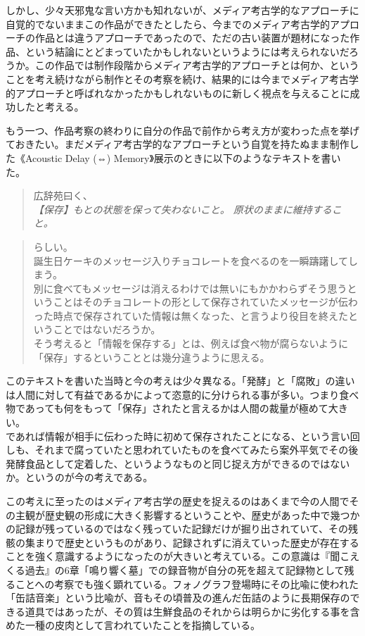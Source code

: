 \documentclass[a4paper,report]{jsbook}
\begin{document}
しかし、少々天邪鬼な言い方かも知れないが、メディア考古学的なアプローチに自覚的でないままこの作品ができたとしたら、今までのメディア考古学的アプローチの作品とは違うアプローチであったので、ただの古い装置が題材になった作品、という結論にとどまっていたかもしれないというようには考えられないだろうか。この作品では制作段階からメディア考古学的アプローチとは何か、ということを考え続けながら制作とその考察を続け、結果的には今までメディア考古学的アプローチと呼ばれなかったかもしれないものに新しく視点を与えることに成功したと考える。

もう一つ、作品考察の終わりに自分の作品で前作から考え方が変わった点を挙げておきたい。まだメディア考古学的なアプローチという自覚を持たぬまま制作した《Acoustic
Delay (⇔) Memory》展示のときに以下のようなテキストを書いた。

\begin{quote}
広辞苑曰く、\\
\emph{【保存】もとの状態を保って失わないこと。
原状のままに維持すること。}
\end{quote}

\begin{quote}
らしい。\\
誕生日ケーキのメッセージ入りチョコレートを食べるのを一瞬躊躇してしまう。\\
別に食べてもメッセージは消えるわけでは無いにもかかわらずそう思うということはそのチョコレートの形として保存されていたメッセージが伝わった時点で保存されていた情報は無くなった、と言うより役目を終えたということではないだろうか。\\
そう考えると「情報を保存する」とは、例えば食べ物が腐らないように「保存」するということとは幾分違うように思える。
\end{quote}

このテキストを書いた当時と今の考えは少々異なる。「発酵」と「腐敗」の違いは人間に対して有益であるかによって恣意的に分けられる事が多い。つまり食べ物であっても何をもって「保存」されたと言えるかは人間の裁量が極めて大きい。\\
であれば情報が相手に伝わった時に初めて保存されたことになる、という言い回しも、それまで腐っていたと思われていたものを食べてみたら案外平気でその後発酵食品として定着した、というようなものと同じ捉え方ができるのではないか。というのが今の考えである。

この考えに至ったのはメディア考古学の歴史を捉えるのはあくまで今の人間でその主観が歴史観の形成に大きく影響するということや、歴史があった中で幾つかの記録が残っているのではなく残っていた記録だけが掘り出されていて、その残骸の集まりで歴史というものがあり、記録されずに消えていった歴史が存在することを強く意識するようになったのが大きいと考えている。この意識は『聞こえくる過去』の6章「鳴り響く墓」での録音物が自分の死を超えて記録物として残ることへの考察でも強く顕れている。フォノグラフ登場時にその比喩に使われた「缶詰音楽」という比喩が、音もその頃普及の進んだ缶詰のように長期保存のできる道具ではあったが、その質は生鮮食品のそれからは明らかに劣化する事を含めた一種の皮肉として言われていたことを指摘している。
\end{document}
